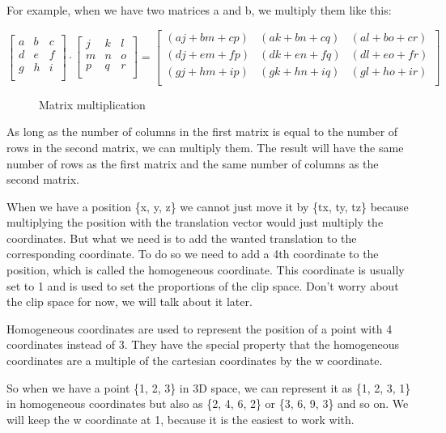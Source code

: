 \documentclass[12pt]{report} \usepackage{preamble}
\begin{document}
For example, when we have two matrices a and b, we multiply them like this:

\[
	\begin{bmatrix}
		a & b & c \\
		d & e & f \\
		g & h & i \\
	\end{bmatrix}
	\cdot
	\begin{bmatrix}
		j & k & l \\
		m & n & o \\
		p & q & r \\
	\end{bmatrix}
	=
	\begin{bmatrix}
		(aj + bm + cp) & (ak + bn + cq) & (al + bo + cr) \\
		(dj + em + fp) & (dk + en + fq) & (dl + eo + fr) \\
		(gj + hm + ip) & (gk + hn + iq) & (gl + ho + ir) \\
	\end{bmatrix}
\]

\begin{figure}[hbtp]
	\centering 
	\caption{Matrix multiplication \cite{fig:matrix-multiplication}}
\end{figure}
\floatbarrier

As long as the number of columns in the first matrix is equal to the number
of rows in the second matrix, we can multiply them. The result will have
the same number of rows as the first matrix and the same number of columns
as the second matrix.

When we have a position \{x, y, z\} we cannot just move it by \{tx, ty, tz\}
because multiplying the position with the translation vector would just
multiply the coordinates. But what we need is to add the wanted translation
to the corresponding coordinate.
To do so we need to add a 4th coordinate to the position, which is called
the homogeneous coordinate. This coordinate is usually set to 1 and is used
to set the proportions of the clip space. Don't worry about the clip space
for now, we will talk about it later.

Homogeneous coordinates are used to represent the position of a point with 4
coordinates instead of 3. They have the special property that the homogeneous
coordinates are a multiple of the cartesian coordinates by the w coordinate.

So when we have a point \{1, 2, 3\} in 3D space, we can represent it as
\{1, 2, 3, 1\} in homogeneous coordinates but also as \{2, 4, 6, 2\} or
\{3, 6, 9, 3\} and so on. We will keep the w coordinate at 1, because it is
the easiest to work with.
\end{document}
